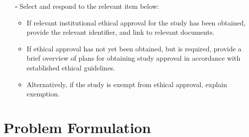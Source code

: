 \documentclass[
]{article}
\providecommand{\tightlist}{%
  \setlength{\itemsep}{0pt}\setlength{\parskip}{0pt}}\usepackage{longtable,booktabs,array}
\begin{document}
\begin{tcolorbox}[enhanced jigsaw, toprule=.15mm, titlerule=0mm, coltitle=black, title=\textcolor{quarto-callout-caution-color}{\faFire}\hspace{0.5em}{Preregistration Item}, bottomtitle=1mm, arc=.35mm, breakable, toptitle=1mm, bottomrule=.15mm, left=2mm, colframe=quarto-callout-caution-color-frame, colback=white, rightrule=.15mm, leftrule=.75mm, colbacktitle=quarto-callout-caution-color!10!white, opacityback=0, opacitybacktitle=0.6]

\begin{itemize}
\tightlist
\item[$\square$]
  Select and respond to the relevant item below:

  \begin{itemize}
  \tightlist
  \item
    If relevant institutional ethical approval for the study has been
    obtained, provide the relevant identifier, and link to relevant
    documents.
  \item
    If ethical approval has not yet been obtained, but is required,
    provide a brief overview of plans for obtaining study approval in
    accordance with established ethical guidelines.
  \item
    Alternatively, if the study is exempt from ethical approval, explain
    exemption.
  \end{itemize}
\end{itemize}

\end{tcolorbox}

\section{Problem Formulation}\label{sec-problem-formulation}
\end{document}
